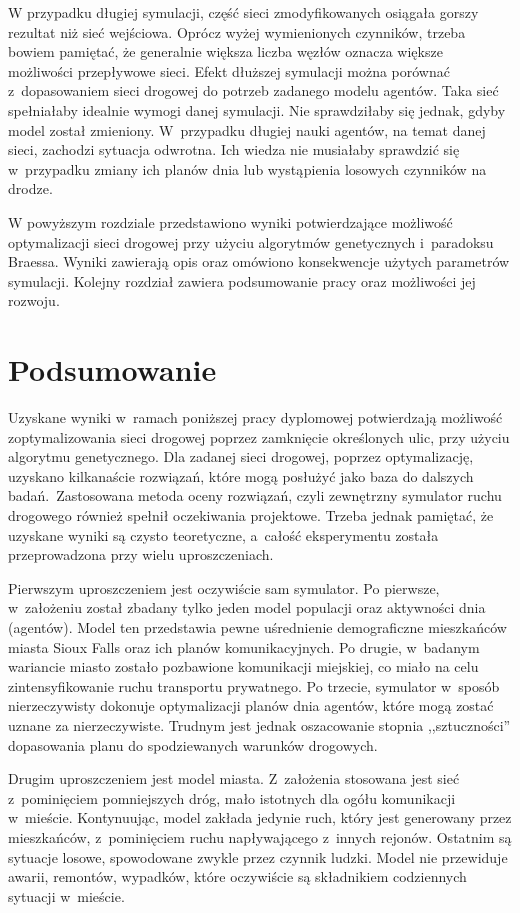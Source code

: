 \documentclass[twoside,12pt]{report}
\let\oldsection\chapter
\def\chapter{\cleardoublepage\oldsection}
\begin{document}
W przypadku długiej symulacji, część sieci zmodyfikowanych osiągała gorszy rezultat niż sieć wejściowa. Oprócz wyżej wymienionych czynników, trzeba bowiem pamiętać, że generalnie większa liczba węzłów oznacza większe możliwości przepływowe sieci. Efekt dłuższej symulacji można porównać z~dopasowaniem sieci drogowej do potrzeb zadanego modelu agentów. Taka sieć spełniałaby idealnie wymogi danej symulacji. Nie sprawdziłaby się jednak, gdyby model został zmieniony. W~przypadku długiej nauki agentów, na temat danej sieci, zachodzi sytuacja odwrotna. Ich wiedza nie musiałaby sprawdzić się w~przypadku zmiany ich planów dnia lub wystąpienia losowych czynników na drodze.

W powyższym rozdziale przedstawiono wyniki potwierdzające możliwość optymalizacji sieci drogowej przy użyciu algorytmów genetycznych i~paradoksu Braessa. Wyniki zawierają opis oraz omówiono konsekwencje użytych parametrów symulacji. Kolejny rozdział zawiera podsumowanie pracy oraz możliwości jej rozwoju.

\chapter{Podsumowanie}\label{rozdz.podsumowanie} 
Uzyskane wyniki w~ramach poniższej pracy dyplomowej potwierdzają możliwość zoptymalizowania sieci drogowej poprzez zamknięcie określonych ulic, przy użyciu algorytmu genetycznego. Dla zadanej sieci drogowej, poprzez optymalizację, uzyskano kilkanaście rozwiązań, które mogą posłużyć jako baza do dalszych badań.~Zastosowana metoda oceny rozwiązań, czyli zewnętrzny symulator ruchu drogowego również spełnił oczekiwania projektowe. Trzeba jednak pamiętać, że uzyskane wyniki są czysto teoretyczne, a~całość eksperymentu została przeprowadzona przy wielu uproszczeniach.

Pierwszym uproszczeniem jest oczywiście sam symulator. Po pierwsze, w~założeniu został zbadany tylko jeden model populacji oraz aktywności dnia (agentów). Model ten przedstawia pewne uśrednienie demograficzne mieszkańców miasta Sioux Falls oraz ich planów komunikacyjnych. Po drugie, w~badanym wariancie miasto zostało pozbawione komunikacji miejskiej, co miało na celu zintensyfikowanie ruchu transportu prywatnego. Po trzecie, symulator w~sposób nierzeczywisty dokonuje optymalizacji planów dnia agentów, które mogą zostać uznane za nierzeczywiste. Trudnym jest jednak oszacowanie stopnia ,,sztuczności'' dopasowania planu do spodziewanych warunków drogowych.

Drugim uproszczeniem jest model miasta. Z~założenia stosowana jest sieć z~pominięciem pomniejszych dróg, mało istotnych dla ogółu komunikacji w~mieście. Kontynuując, model zakłada jedynie ruch, który jest generowany przez mieszkańców, z~pominięciem ruchu napływającego z~innych rejonów. Ostatnim są sytuacje losowe, spowodowane zwykle przez czynnik ludzki. Model nie przewiduje awarii, remontów, wypadków, które oczywiście są składnikiem codziennych sytuacji w~mieście. 
\end{document}
